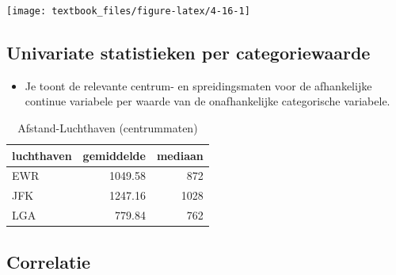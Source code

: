 \documentclass[]{tufte-book}
\providecommand{\tightlist}{%
  \setlength{\itemsep}{0pt}\setlength{\parskip}{0pt}}
\begin{document}
\texttt{[image: textbook\_files/figure-latex/4-16-1]}

\hypertarget{univariate-statistieken-per-categoriewaarde-1}{%
\subsection*{Univariate statistieken per categoriewaarde}\label{univariate-statistieken-per-categoriewaarde-1}}

\begin{itemize}
\tightlist
\item
  Je toont de relevante centrum- en spreidingsmaten voor de afhankelijke continue variabele per waarde van de onafhankelijke categorische variabele.
\end{itemize}

\begin{table}

\caption{\label{tab:4-17}Afstand-Luchthaven (centrummaten)}
\centering
\fontsize{10}{12}\selectfont
\begin{tabular}[t]{lrr}
\toprule
luchthaven & gemiddelde & mediaan\\
\midrule
EWR & 1049.58 & 872\\
JFK & 1247.16 & 1028\\
LGA & 779.84 & 762\\
\bottomrule
\end{tabular}
\end{table}

\begin{table}

\caption{\label{tab:4-18}Afstand-Luchthaven (spreidingsmaten)}
\centering
{}
\end{table}

\hypertarget{correlatie}{%
\subsection*{Correlatie}\label{correlatie}}
\end{document}

